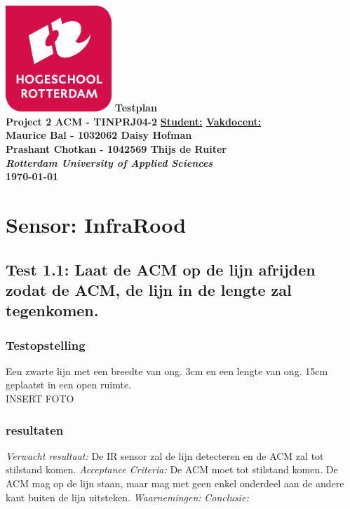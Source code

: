 \documentclass{article}
\begin{document}
\sffamily
\begin{titlepage}
  \centering
    \vfill
    \vfill
    \includegraphics[width=4cm]{logohr} %
    \vfill
    \vfill
    {\bfseries\Huge
      Testplan\\
      Project 2 ACM - TINPRJ04-2
      \vskip6cm
    }
      {
        \bfseries\normalsize
        \textbf{\underline{Student:}}
        \hfill
        \textbf{\underline{Vakdocent:}} \\
        Maurice Bal - 1032062
        \hfill
        Daisy Hofman\\
        Prashant Chotkan - 1042569
        \hfill
        Thijs de Ruiter\\
        \vskip6cm       
      }
      {\bfseries\Large
        \textit{Rotterdam University of Applied Sciences}\\
        \monthyeardate\today\\
      }
    \vfill
    
    \vfill
    \vfill
\end{titlepage}
\newpage
\tableofcontents
\newpage

\section{Sensor: InfraRood}
\subsection{Test 1.1: Laat de ACM op de lijn afrijden zodat de ACM, de lijn in de lengte zal tegenkomen.}
\subsubsection{Testopstelling}
Een zwarte lijn met een breedte van ong. 3cm en een lengte van ong. 15cm geplaatst in een open ruimte.\\
INSERT FOTO
\subsubsection{resultaten}
\textit{Verwacht resultaat: } De IR sensor zal de lijn detecteren en de ACM zal tot stilstand komen.
\newline
\textit{Acceptance Criteria: }De ACM moet tot stilstand komen. De ACM mag op de lijn staan, maar mag met geen enkel onderdeel aan de andere kant buiten de lijn uitsteken.
\newline
\textit{Waarnemingen: }
\newline
\textit{Conclusie: }
\end{document}
